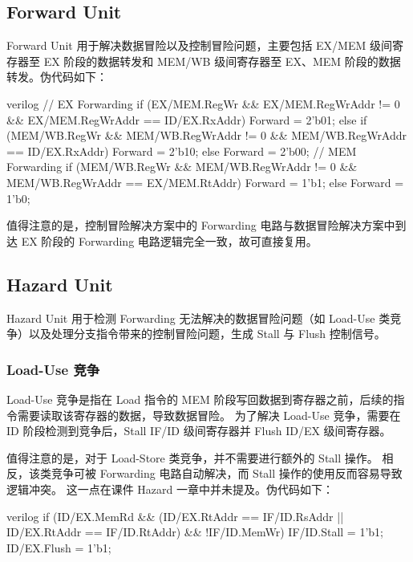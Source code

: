 \documentclass[a4paper]{article}  %
\begin{document}
\subsection{Forward Unit}

Forward Unit 用于解决数据冒险以及控制冒险问题，主要包括 EX/MEM 级间寄存器至 EX 阶段的数据转发和 MEM/WB 级间寄存器至 EX、MEM 阶段的数据转发。伪代码如下：

\begin{codeblock}{verilog}
    // EX Forwarding
    if (EX/MEM.RegWr && EX/MEM.RegWrAddr != 0 && EX/MEM.RegWrAddr == ID/EX.RxAddr) {
        Forward = 2'b01;
    } else if (MEM/WB.RegWr && MEM/WB.RegWrAddr != 0 && MEM/WB.RegWrAddr == ID/EX.RxAddr) {
        Forward = 2'b10;
    } else {
        Forward = 2'b00;
    }
    // MEM Forwarding
    if (MEM/WB.RegWr && MEM/WB.RegWrAddr != 0 && MEM/WB.RegWrAddr == EX/MEM.RtAddr) {
        Forward = 1'b1;
    } else {
        Forward = 1'b0;
    }
\end{codeblock}

值得注意的是，控制冒险解决方案中的 Forwarding 电路与数据冒险解决方案中到达 EX 阶段的 Forwarding 电路逻辑完全一致，故可直接复用。

\subsection{Hazard Unit}

Hazard Unit 用于检测 Forwarding 无法解决的数据冒险问题（如 Load-Use 类竞争）以及处理分支指令带来的控制冒险问题，生成 Stall 与 Flush 控制信号。

\subsubsection{Load-Use 竞争}

Load-Use 竞争是指在 Load 指令的 MEM 阶段写回数据到寄存器之前，后续的指令需要读取该寄存器的数据，导致数据冒险。
为了解决 Load-Use 竞争，需要在 ID 阶段检测到竞争后，Stall IF/ID 级间寄存器并 Flush ID/EX 级间寄存器。

值得注意的是，对于 Load-Store 类竞争，并不需要进行额外的 Stall 操作。
相反，该类竞争可被 Forwarding 电路自动解决，而 Stall 操作的使用反而容易导致逻辑冲突。
这一点在课件 Hazard 一章中并未提及。伪代码如下：

\begin{codeblock}{verilog}
    if (ID/EX.MemRd && (ID/EX.RtAddr == IF/ID.RsAddr || ID/EX.RtAddr == IF/ID.RtAddr) && !IF/ID.MemWr) {
        IF/ID.Stall = 1'b1;
        ID/EX.Flush = 1'b1;
    }
\end{codeblock}
\end{document}
